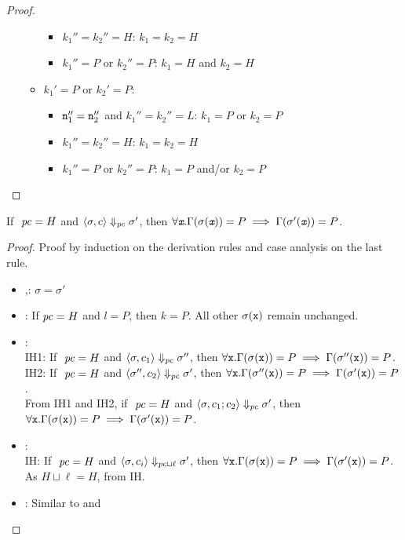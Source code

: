 \begin{proof}
\begin{enumerate}
\begin{itemize}
\begin{itemize}
    \item $k_1'' = k_2'' = H$: $k_1 = k_2 = H$
    \item $k_1'' = P$ or $k_2'' = P$: $k_1 = H$ and $k_2 = H$
  \end{itemize}
\item $k_1' = P$ or $k_2' = P$:
  \begin{itemize}
    \item $\texttt{n}_1'' = \texttt{n}_2''$ and $k_1'' = k_2'' = L$: $k_1 = P$ or $k_2 =P$
    \item $k_1'' = k_2'' = H$: $k_1 = k_2 = H$
    \item $k_1'' = P$ or $k_2'' = P$: $k_1 = P$ and/or $k_2 = P$
  \end{itemize}
\end{itemize}
\end{enumerate}
\end{proof}

\begin{myLemma}[Evolution]
\label{lem:app:gpu:evol}
  If $~\mathit{pc} = H$ and $\langle \sigma, c \rangle \Downarrow_{\mathit{pc}} \sigma'
  $, then $\forall \emph{\texttt{x}}.\Gamma(\sigma(\emph{\texttt{x}})) = P
  \implies \Gamma(\sigma'(\emph{\texttt{x}})) = P$. 
\end{myLemma}
\begin{proof} Proof by induction on the derivation rules and case
  analysis on the last rule.
  \begin{itemize}
    \item {},: $\sigma = \sigma'$
    \item {}: If $\mathit{pc} =H$ and $l =
      P$, then $k = P$. All other $\sigma(\texttt{x})$ remain unchanged. 
    \item {}: \\
      IH1: If $~\mathit{pc} = H$ and $\langle \sigma, c_1 \rangle
      \Downarrow_{\mathit{pc}} \sigma''$, then $\forall \texttt{x}.\Gamma(\sigma(\texttt{x})) = P
      \implies \Gamma(\sigma''(\texttt{x})) = P$.\\
      IH2: If $~\mathit{pc} = H$ and $\langle \sigma'', c_2 \rangle
      \Downarrow_{\mathit{pc}} \sigma'$, then $\forall \texttt{x}. \Gamma(\sigma''(\texttt{x})) = P
      \implies \Gamma(\sigma'(\texttt{x})) = P$.\\
      From IH1 and IH2, if $~\mathit{pc} = H$ and $\langle \sigma, c_1;c_2 \rangle
      \Downarrow_{\mathit{pc}} \sigma'$, then $\forall \texttt{x}. \Gamma(\sigma(\texttt{x})) = P
      \implies \Gamma(\sigma'(\texttt{x})) = P$.
    \item {}: \\
      IH: If $~\mathit{pc} = H$ and $\langle \sigma, c_i \rangle
      \Downarrow_{\mathit{pc} \sqcup \ell} \sigma'$, then $\forall \texttt{x}. \Gamma(\sigma(\texttt{x})) = P
      \implies \Gamma(\sigma'(\texttt{x})) = P$.\\ As $H \sqcup \ell = H$, from
      IH.
    \item {}: Similar to  and 
  \end{itemize}
\end{proof}


